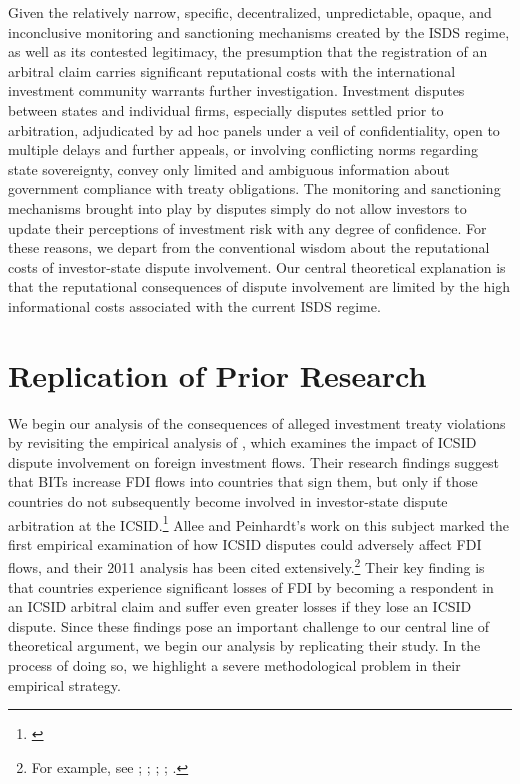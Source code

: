 \documentclass[12pt,onesided]{amsart}
\begin{document}
Given the relatively narrow, specific, decentralized, unpredictable, opaque, and inconclusive  monitoring and sanctioning mechanisms created by the ISDS regime, as well as its contested legitimacy, the presumption that the registration of an arbitral claim carries significant reputational costs with the international investment community warrants further investigation. Investment disputes between states and individual firms, especially disputes settled prior to arbitration, adjudicated by ad hoc panels under a veil of confidentiality, open to multiple delays and further appeals, or involving conflicting norms regarding state sovereignty, convey only limited and ambiguous information about government compliance with treaty obligations. The monitoring and sanctioning mechanisms brought into play by disputes simply do not allow investors to update their perceptions of investment risk with any degree of confidence. For these reasons, we depart from the conventional wisdom about the reputational costs of investor-state dispute involvement. Our central theoretical explanation is that the reputational consequences of dispute involvement are limited by the high informational costs associated with the current ISDS regime. 

\section*{Replication of Prior Research}

We begin our analysis of the consequences of alleged investment treaty violations by revisiting the empirical analysis of \citeauthor{allee:peinhardt:2011}, which examines the impact of ICSID dispute involvement on foreign investment flows. Their research findings suggest that BITs increase FDI flows into countries that sign them, but only if those countries do not subsequently become involved in investor-state dispute arbitration at the ICSID.\footnote{\citet{allee:peinhardt:2011}} Allee and Peinhardt's work on this subject marked the first empirical examination of how ICSID disputes could adversely affect FDI flows, and their 2011 analysis has been cited extensively.\footnote{For example, see \citet{berger2011more}; \citet{poulsen2013claim}; \citet{wellhausen2013}; \citet{haftel2013delayed}; \citet{kerner2014}.} Their key finding is that countries experience significant losses of FDI by becoming a respondent in an ICSID arbitral claim and suffer even greater losses if they lose an ICSID dispute. Since these findings pose an important challenge to our central line of theoretical argument, we begin our analysis by replicating their study. In the process of doing so, we highlight a severe methodological problem in their empirical strategy.
\end{document}
